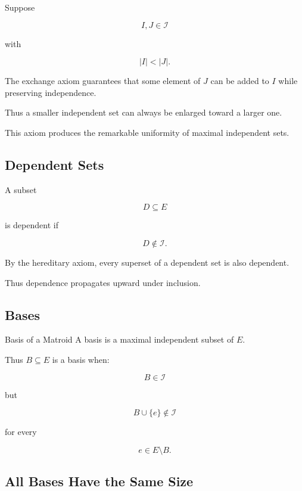Suppose

\[
I,J\in\mathcal{I}
\]

with

\[
|I|<|J|.
\]

The exchange axiom guarantees that some element of \(J\) can be added
to \(I\) while preserving independence.

Thus a smaller independent set can always be enlarged toward a larger
one.

This axiom produces the remarkable uniformity of maximal independent
sets.

\subsection{Dependent Sets}
\label{subsec:matroid-dependent-sets}

A subset

\[
D\subseteq E
\]

is dependent if

\[
D\notin\mathcal{I}.
\]

By the hereditary axiom, every superset of a dependent set is also
dependent.

Thus dependence propagates upward under inclusion.

\subsection{Bases}
\label{subsec:matroid-bases}

\begin{definitionbox}{Basis of a Matroid}
A basis is a maximal independent subset of \(E\).
\end{definitionbox}

Thus \(B\subseteq E\) is a basis when:

\[
B\in\mathcal{I}
\]

but

\[
B\cup\{e\}\notin\mathcal{I}
\]

for every

\[
e\in E\setminus B.
\]

\subsection{All Bases Have the Same Size}
\label{subsec:all-bases-same-size}

